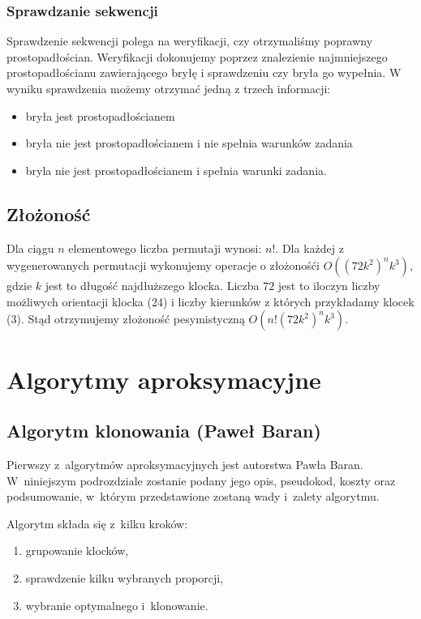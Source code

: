 \documentclass[12pt]{article}
\begin{document}
\subsubsection{Sprawdzanie sekwencji}
Sprawdzenie sekwencji polega na weryfikacji, czy otrzymaliśmy poprawny prostopadłościan. Weryfikacji dokonujemy
poprzez znalezienie najmniejszego prostopadłościanu zawierającego bryłę i sprawdzeniu czy bryła go wypełnia.
 W wyniku sprawdzenia możemy otrzymać jedną z trzech informacji:
\begin{itemize}
 \item bryła jest prostopadłościanem
 \item bryła nie jest prostopadłościanem i nie spełnia warunków zadania
 \item bryla nie jest prostopadłościanem i spełnia warunki zadania.
\end{itemize}

\subsection{Złożoność}
Dla ciągu $n$ elementowego liczba permutaji wynosi: $n!$. Dla każdej z 
wygenerowanych permutacji wykonujemy operacje o złożonośći $O((72k^2)^nk^3)$, gdzie $k$ jest to 
długość najdłuższego klocka. Liczba $72$ jest to iloczyn liczby możliwych orientacji klocka (24)
i liczby kierunków z których przykładamy klocek (3). Stąd otrzymujemy złożoność pesymistyczną $O(n!(72k^2)^nk^3)$.

\section{Algorytmy aproksymacyjne}

\subsection{Algorytm klonowania (Paweł Baran)}
Pierwszy z~algorytmów aproksymacyjnych jest autorstwa Pawła Baran.
W~niniejszym podrozdziale zostanie podany jego opis, pseudokod, koszty oraz
podsumowanie, w~którym przedstawione zostaną wady i~zalety algorytmu.

Algorytm składa się z~kilku kroków:
\begin{enumerate}
	\item grupowanie klocków,
	\item sprawdzenie kilku wybranych proporcji,
	\item wybranie optymalnego i~klonowanie.
\end{enumerate}
\end{document}
